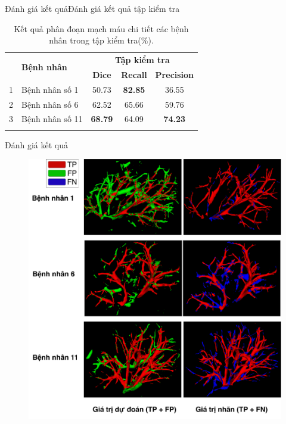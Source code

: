 \documentclass[
	10pt,                %
	aspectratio=169,     %
]{beamer}
\begin{document}
    \begin{frame}{Đánh giá kết quả}{Đánh giá kết quả tập kiểm tra}
        \begin{table}[H]
        \renewcommand{\arraystretch}{1.1}
        \centering
        \begin{tabular}{c l c c c}
            \Xhline{2\arrayrulewidth}
            \multirow{2}{*}{\textbf{STT}} & \multirow{2}{*}{\textbf{Bệnh nhân}} & \multicolumn{3}{c}{\textbf{Tập kiểm tra}} \\ \cline{3-5}
            & &  \textbf{Dice} & \textbf{Recall} & \textbf{Precision} \\ 
            \Xhline{2\arrayrulewidth}
            1   & Bệnh nhân số 1 & 50.73 & \textbf{82.85} & 36.55\\
            2   & Bệnh nhân số 6 & 62.52 & 65.66 & 59.76 \\
            3   & Bệnh nhân số 11 & \textbf{68.79} & 64.09 & \textbf{74.23} \\
            \Xhline{2\arrayrulewidth}
        \end{tabular}
        \caption{Kết quả phân đoạn mạch máu chi tiết các bệnh nhân trong tập kiểm tra(\%).}
        \end{table}
    \end{frame}
    
    \begin{frame}{Đánh giá kết quả}{}
        \vspace{-0.3cm}
        \begin{figure}[H]
			\centering
		    \includegraphics[height=0.9\textheight]{Presentation_template/figures/dataset/3d_vessel.pdf}
		\end{figure}
    \end{frame}
    
\end{document}
